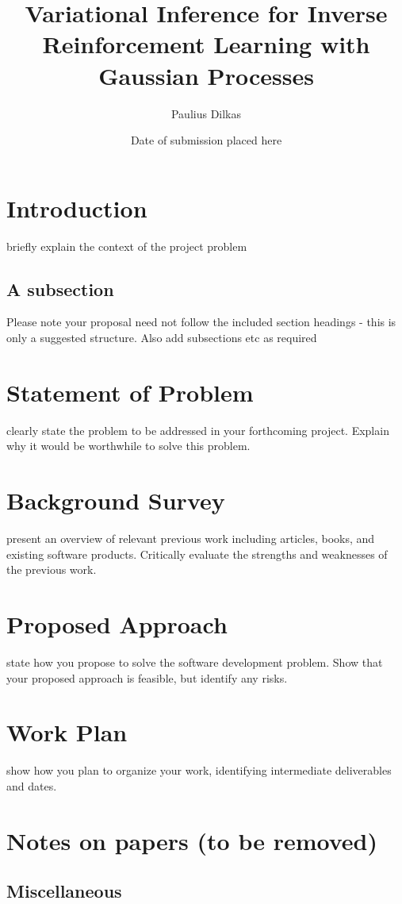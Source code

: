 \documentclass{mprop}
\begin{document}
\title{Variational Inference for Inverse Reinforcement Learning with Gaussian
  Processes}
\author{Paulius Dilkas}
\date{Date of submission placed here} %
\maketitle
\tableofcontents
\newpage

\section{Introduction}\label{intro}
briefly explain the context of the project problem
\subsection{A subsection}
Please note your proposal need not follow the included section headings - this is only a suggested structure. Also add subsections etc as required
\section{Statement of Problem}
clearly state the problem to be addressed in your forthcoming project. Explain why it would be worthwhile to solve this problem.
\section{Background Survey}
present an overview of relevant previous work including articles, books, and existing software products. Critically evaluate the strengths and weaknesses of the previous work.
\section{Proposed Approach}
state how you propose to solve the software development problem. Show that your proposed approach is feasible, but identify any risks.
\section{Work Plan}
show how you plan to organize your work, identifying intermediate deliverables and dates.

\section{Notes on papers (to be removed)}

\subsection{Miscellaneous}
\end{document}
